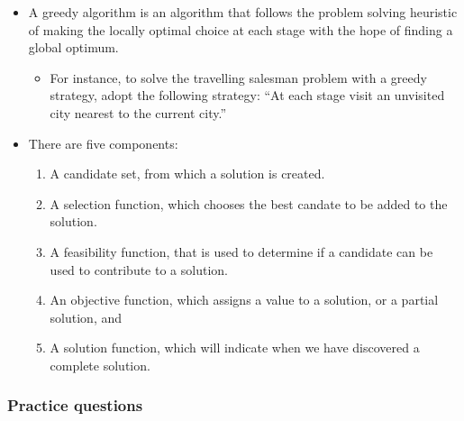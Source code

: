 \documentclass[a4paper,11pt]{article}
\begin{document}
\begin{itemize}
\itemsep1pt\parskip0pt
\item
  A greedy algorithm is an algorithm that follows the problem solving
  heuristic of making the locally optimal choice at each stage with the
  hope of finding a global optimum.

  \begin{itemize}
  \itemsep1pt\parskip0pt
  \item
    For instance, to solve the travelling salesman problem with a greedy
    strategy, adopt the following strategy: ``At each stage visit an
    unvisited city nearest to the current city.''
  \end{itemize}
\item
  There are five components:

  \begin{enumerate}
  \def\labelenumi{\arabic{enumi}.}
  \itemsep1pt\parskip0pt
  \item
    A candidate set, from which a solution is created.
  \item
    A selection function, which chooses the best candate to be added to
    the solution.
  \item
    A feasibility function, that is used to determine if a candidate can
    be used to contribute to a solution.
  \item
    An objective function, which assigns a value to a solution, or a
    partial solution, and
  \item
    A solution function, which will indicate when we have discovered a
    complete solution.
  \end{enumerate}
\end{itemize}

\subsubsection{Practice questions}\label{practice-questions-8}
\end{document}
